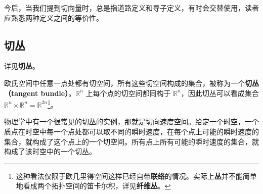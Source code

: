 今后，当我们提到切向量时，总是指道路定义和导子定义，有时会交替使用，读者应熟悉两种定义之间的等价性。

\subsection{切丛}
详见\textbf{切丛}。

欧氏空间中任意一点处都有切空间，所有这些切空间构成的集合，被称为一个\textbf{切丛（tangent bundle）}。$\mathbb{R}^n$ 上每个点的切空间都同构于 $\mathbb{R}^n$，因此切丛可以看成集合 $\mathbb{R}^n\times\mathbb{R}^n=\mathbb{R}^{2n}$\footnote{这种看法仅限于欧几里得空间这样已经自带\textbf{联络}的情况。实际上\textbf{丛}并不能简单地看成两个拓扑空间的笛卡尔积，详见\textbf{纤维丛}。}。

物理学中有一个很常见的切丛的实例，那就是切向速度空间。给定一个时空，一个质点在时空中每一个点处都可以取不同的瞬时速度，在每个点上可能的瞬时速度的集合，就构成了这个点上的一个切空间。所有点上所有可能的瞬时速度的集合，就构成了该时空中的一个切丛。









